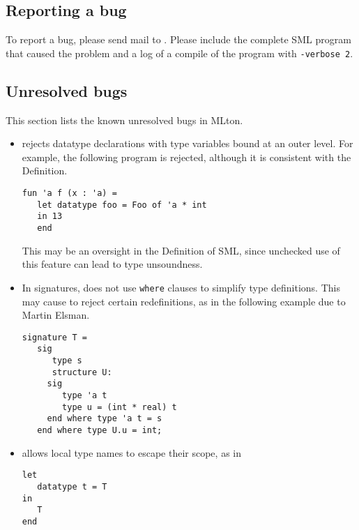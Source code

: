 %
\subsection{Reporting a bug}

To report a bug, please send mail to {\mltonmail}.  Please include the
complete SML program that caused the problem and a log of a compile of
the program with {\tt -verbose 2}.
%
\subsection{Unresolved bugs}

This section lists the known unresolved bugs in MLton.

\begin{itemize}

\item
{\mlton} rejects datatype declarations with type variables bound at
an outer level.  For example, the following program is rejected,
although it is consistent with the Definition.
\begin{verbatim}
fun 'a f (x : 'a) =
   let datatype foo = Foo of 'a * int
   in 13
   end
\end{verbatim}
This may be an oversight in the Definition of SML, since unchecked use
of this feature can lead to type unsoundness.

\item
In signatures, {\mlton} does not use {\tt where} clauses to simplify
type definitions.  This may cause {\mlton} to reject certain
redefinitions, as in the following example due to Martin Elsman.
\begin{verbatim}
signature T =	
   sig
      type s
      structure U:
	 sig
	    type 'a t
	    type u = (int * real) t
	 end where type 'a t = s
   end where type U.u = int;
\end{verbatim}

\item
{\mlton} allows local type names to escape their scope, as in
\begin{verbatim}
let
   datatype t = T
in
   T
end
\end{verbatim}

\end{itemize}
